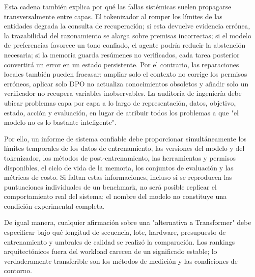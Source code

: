 \documentclass[a4paper]{article}
\begin{document}
Esta cadena también explica por qué las fallas sistémicas suelen propagarse transversalmente entre capas. El tokenizador al romper los límites de las entidades degrada la consulta de recuperación; si esta devuelve evidencia errónea, la trazabilidad del razonamiento se alarga sobre premisas incorrectas; si el modelo de preferencias favorece un tono confiado, el agente podría reducir la abstención necesaria; si la memoria guarda resúmenes no verificados, cada tarea posterior convertirá un error en un estado persistente. Por el contrario, las reparaciones locales también pueden fracasar: ampliar solo el contexto no corrige los permisos erróneos, aplicar solo DPO no actualiza conocimientos obsoletos y añadir solo un verificador no recupera variables inobservables. La auditoría de ingeniería debe ubicar problemas capa por capa a lo largo de representación, datos, objetivo, estado, acción y evaluación, en lugar de atribuir todos los problemas a que "el modelo no es lo bastante inteligente".

Por ello, un informe de sistema confiable debe proporcionar simultáneamente los límites temporales de los datos de entrenamiento, las versiones del modelo y del tokenizador, los métodos de post-entrenamiento, las herramientas y permisos disponibles, el ciclo de vida de la memoria, los conjuntos de evaluación y las métricas de costo. Si faltan estas informaciones, incluso si se reproducen las puntuaciones individuales de un benchmark, no será posible replicar el comportamiento real del sistema; el nombre del modelo no constituye una condición experimental completa.

De igual manera, cualquier afirmación sobre una "alternativa a Transformer" debe especificar bajo qué longitud de secuencia, lote, hardware, presupuesto de entrenamiento y umbrales de calidad se realizó la comparación. Los rankings arquitectónicos fuera del workload carecen de un significado estable; lo verdaderamente transferible son los métodos de medición y las condiciones de contorno.
\end{document}
